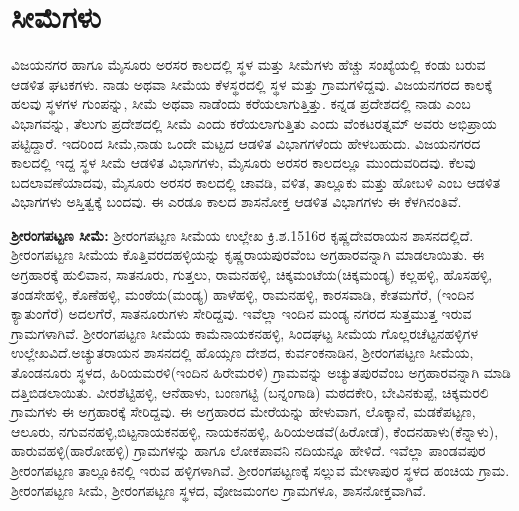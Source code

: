 \section{ಸೀಮೆಗಳು}

ವಿಜಯನಗರ ಹಾಗೂ ಮೈಸೂರು ಅರಸರ ಕಾಲದಲ್ಲಿ ಸ್ಥಳ ಮತ್ತು ಸೀಮೆಗಳು ಹೆಚ್ಚು ಸಂಖ್ಯೆಯಲ್ಲಿ ಕಂಡು ಬರುವ ಆಡಳಿತ ಘಟಕಗಳು. ನಾಡು ಅಥವಾ ಸೀಮೆಯ ಕೆಳಸ್ಥರದಲ್ಲಿ ಸ್ಥಳ ಮತ್ತು ಗ್ರಾಮಗಳಿದ್ದವು. ವಿಜಯನಗರದ ಕಾಲಕ್ಕೆ ಹಲವು ಸ್ಥಳಗಳ ಗುಂಪನ್ನು, ಸೀಮೆ ಅಥವಾ ನಾಡೆಂದು ಕರೆಯಲಾಗುತ್ತಿತ್ತು. ಕನ್ನಡ ಪ್ರದೇಶದಲ್ಲಿ ನಾಡು ಎಂಬ ವಿಭಾಗವನ್ನು, ತೆಲುಗು ಪ್ರದೇಶದಲ್ಲಿ ಸೀಮೆ ಎಂದು ಕರೆಯಲಾಗುತ್ತಿತು ಎಂದು ವೆಂಕಟರತ್ನಮ್ ಅವರು ಅಭಿಪ್ರಾಯ ಪಟ್ಟಿದ್ದಾರೆ. ಇದರಿಂದ ಸೀಮೆ,ನಾಡು ಒಂದೇ ಮಟ್ಟದ ಆಡಳಿತ ವಿಭಾಗಗಳೆಂದು ಹೇಳಬಹುದು. ವಿಜಯನಗರದ ಕಾಲದಲ್ಲಿ ಇದ್ದ ಸ್ಥಳ ಸೀಮೆ ಆಡಳಿತ ವಿಭಾಗಗಳು, ಮೈಸೂರು ಅರಸರ ಕಾಲದಲ್ಲೂ ಮುಂದುವರಿದವು. ಕೆಲವು ಬದಲಾವಣೆಯಾದವು, ಮೈಸೂರು ಅರಸರ ಕಾಲದಲ್ಲಿ ಚಾವಡಿ, ವಳಿತ, ತಾಲ್ಲೂಕು ಮತ್ತು ಹೋಬಳಿ ಎಂಬ ಆಡಳಿತ ವಿಭಾಗಗಳು ಅಸ್ತಿತ್ವಕ್ಕೆ ಬಂದವು. ಈ ಎರಡೂ ಕಾಲದ ಶಾಸನೋಕ್ತ ಆಡಳಿತ ವಿಭಾಗಗಳು ಈ ಕೆಳಗಿನಂತಿವೆ.

\textbf{ಶ‍್ರೀರಂಗಪಟ್ಟಣ ಸೀಮೆ:} ಶ‍್ರೀರಂಗಪಟ್ಟಣ ಸೀಮೆಯ ಉಲ್ಲೇಖ ಕ್ರಿ.ಶ.1516ರ ಕೃಷ್ಣದೇವರಾಯನ ಶಾಸನದಲ್ಲಿದೆ. ಶ‍್ರೀರಂಗಪಟ್ಟಣ ಸೀಮೆಯ ಕೊತ್ತಿವರದಹಳ್ಳಿಯನ್ನು ಕೃಷ್ಣರಾಯಪುರವೆಂಬ ಅಗ್ರಹಾರವನ್ನಾಗಿ ಮಾಡಲಾಯಿತು. ಈ ಅಗ್ರಹಾರಕ್ಕೆ ಹುಲಿವಾನ, ಸಾತನೂರು, ಗುತ್ತಲು, ರಾಮನಹಳ್ಳಿ, ಚಿಕ್ಕಮಂಟೆಯ(ಚಿಕ್ಕಮಂಡ್ಯ) ಕಲ್ಲಹಳ್ಳಿ, ಹೊಸಹಳ್ಳಿ, ತಂಡಸೇಹಳ್ಳಿ, ಕೊಣೆಹಳ್ಳಿ, ಮಂಠೆಯ(ಮಂಡ್ಯ) ಹಾಳೆಹಳ್ಳಿ, ರಾಮನಹಳ್ಳಿ, ಕಾರಸವಾಡಿ, ಕೇತಮಗೆರೆ, (ಇಂದಿನ ಕ್ಯಾತುಂಗೆರೆ) ಅದಲಗೆರೆ, ಸಾತನೂರುಗಳು ಸೇರಿದ್ದವು. ಇವೆಲ್ಲಾ ಇಂದಿನ ಮಂಡ್ಯ ನಗರದ ಸುತ್ತಮುತ್ತ ಇರುವ ಗ್ರಾಮಗಳಾಗಿವೆ. ಶ‍್ರೀರಂಗಪಟ್ಟಣ ಸೀಮೆಯ ಕಾಮೆನಾಯಕನಹಳ್ಳಿ, ಸಿಂದಘಟ್ಟ ಸೀಮೆಯ ಗೊಲ್ಲರಚೆಟ್ಟನಹಳ್ಳಿಗಳ ಉಲ್ಲೇಖವಿದೆ.\break ಅಚ್ಯುತರಾಯನ ಶಾಸನದಲ್ಲಿ ಹೊಯ್ಸಣ ದೇಶದ, ಕುರ್ವಂಕನಾಡಿನ, ಶ‍್ರೀರಂಗಪಟ್ಟಣ ಸೀಮೆಯ, ತೊಂಡನೂರು ಸ್ಥಳದ, ಹಿರಿಯಮರಳಿ(ಇಂದಿನ ಹಿರೇಮರಳಿ) ಗ್ರಾಮವನ್ನು ಅಚ್ಯುತಪುರವೆಂಬ ಅಗ್ರಹಾರವನ್ನಾಗಿ ಮಾಡಿ ದತ್ತಿಬಿಡಲಾಯಿತು. ವೀರಶೆಟ್ಟಿಹಳ್ಳಿ, ಆನೆಹಾಳು, ಬಂಣಗಟ್ಟಿ (ಬನ್ನಂಗಾಡಿ) ಮಠದಕೇರಿ, ಬೇವಿನಕುಪ್ಪೆ, ಚಿಕ್ಕಮರಲಿ ಗ್ರಾಮಗಳು ಈ ಅಗ್ರಹಾರಕ್ಕೆ ಸೇರಿದ್ದವು. ಈ ಅಗ್ರಹಾರದ ಮೇರೆಯನ್ನು ಹೇಳುವಾಗ, ಲೊಕ್ಕಾನೆ, ಮಡಕೆಪಟ್ಟಣ, ಆಲೂರು, ನಗುವನಹಳ್ಳಿ,\break ಬಿಟ್ಟನಾಯಕನಹಳ್ಳಿ, ನಾಯಕನಹಳ್ಳಿ, ಹಿರಿಯಅಡವೆ(ಹಿರೋಡೆ), ಕೆಂದನಹಾಳು(ಕೆನ್ನಾಳು), ಹಾರುವಹಳ್ಳಿ(ಹಾರೋಹಳ್ಳಿ) ಗ್ರಾಮಗಳನ್ನು ಹಾಗೂ ಲೋಕಪಾವನಿ ನದಿಯನ್ನೂ ಹೇಳಿದೆ. ಇವೆಲ್ಲಾ ಪಾಂಡವಪುರ ಶ‍್ರೀರಂಗಪಟ್ಟಣ ತಾಲ್ಲೂಕಿನಲ್ಲಿ ಇರುವ ಹಳ್ಳಿಗಳಾಗಿವೆ. ಶ‍್ರೀರಂಗಪಟ್ಟಣಕ್ಕೆ ಸಲ್ಲುವ ಮೇಳಾಪುರ ಸ್ಥಳದ ಹಂಚಿಯ ಗ್ರಾಮ. ಶ‍್ರೀರಂಗಪಟ್ಟಣ ಸೀಮೆ, ಶ‍್ರೀರಂಗಪಟ್ಟಣ ಸ್ಥಳದ, ವೋಜಮಂಗಲ ಗ್ರಾಮಗಳೂ, ಶಾಸನೋಕ್ತವಾಗಿವೆ.

